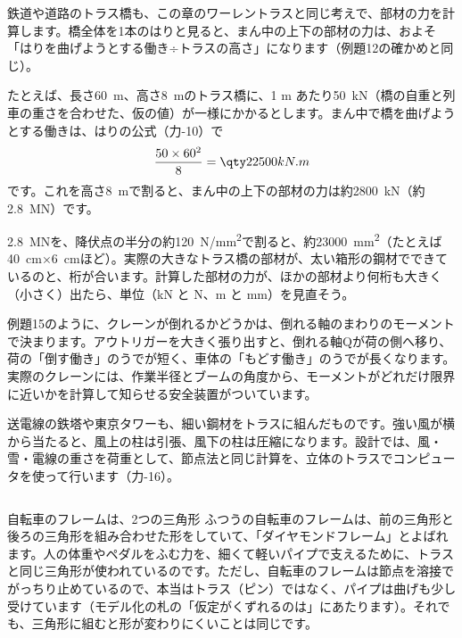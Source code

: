 \begin{phkougaku}[トラス橋の部材の力]
\noindent 鉄道や道路のトラス橋も、この章のワーレントラスと同じ考えで、部材の力を計算します。橋全体を1本のはりと見ると、まん中の上下の部材の力は、およそ「はりを曲げようとする働き÷トラスの高さ」になります（例題12の確かめと同じ）。

たとえば、長さ\qty{60}{m}、高さ\qty{8}{m}のトラス橋に、1 m あたり\qty{50}{kN}（橋の自重と列車の重さを合わせた、仮の値）が一様にかかるとします。まん中で橋を曲げようとする働きは、はりの公式（力-10）で
\[ \frac{50\times60^2}{8}=\pxfkNm{22500} \]
です。これを高さ\qty{8}{m}で割ると、まん中の上下の部材の力は約\qty{2800}{kN}（約\qty{2.8}{MN}）です。

\begin{phketa}[構造の力の大きさ]
\qty{2.8}{MN}を、降伏点の半分の約\qty{120}{N/mm^2}で割ると、約\qty{23000}{mm^2}（たとえば\qty{40}{cm}×\qty{6}{cm}ほど）。実際の大きなトラス橋の部材が、太い箱形の鋼材でできているのと、桁が合います。計算した部材の力が、ほかの部材より何桁も大きく（小さく）出たら、単位（kN と N、m と mm）を見直そう。
\end{phketa}

例題15のように、クレーンが倒れるかどうかは、倒れる軸のまわりのモーメントで決まります。アウトリガーを大きく張り出すと、倒れる軸Qが荷の側へ移り、荷の「倒す働き」のうでが短く、車体の「もどす働き」のうでが長くなります。実際のクレーンには、作業半径とブームの角度から、モーメントがどれだけ限界に近いかを計算して知らせる安全装置がついています。

送電線の鉄塔や東京タワーも、細い鋼材をトラスに組んだものです。強い風が横から当たると、風上の柱は引張、風下の柱は圧縮になります。設計では、風・雪・電線の重さを荷重として、節点法と同じ計算を、立体のトラスでコンピュータを使って行います（力-16）。
\end{phkougaku}

\begin{column}{自転車のフレームは、2つの三角形}
ふつうの自転車のフレームは、前の三角形と後ろの三角形を組み合わせた形をしていて、「ダイヤモンドフレーム」とよばれます。人の体重やペダルをふむ力を、細くて軽いパイプで支えるために、トラスと同じ三角形が使われているのです。ただし、自転車のフレームは節点を溶接でがっちり止めているので、本当はトラス（ピン）ではなく、パイプは曲げも少し受けています（モデル化の札の「仮定がくずれるのは」にあたります）。それでも、三角形に組むと形が変わりにくいことは同じです。
\end{column}


